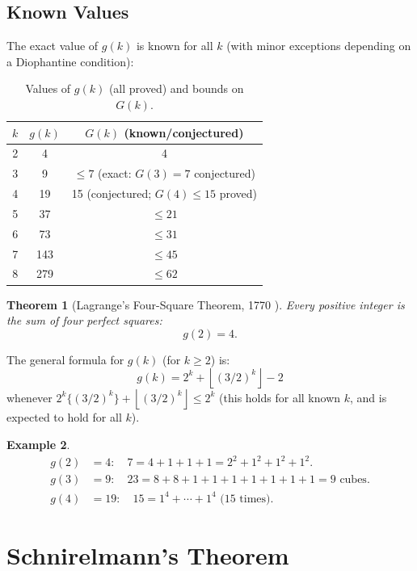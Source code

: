 \documentclass[12pt,a4paper]{amsart}
\newtheorem{theorem}{Theorem}[section]
\theoremstyle{definition}
\newtheorem{example}[theorem]{Example}
\newcommand{\floor}[1]{\left\lfloor #1 \right\rfloor}
\begin{document}
\subsection{Known Values}

The exact value of $g(k)$ is known for all $k$ (with minor exceptions
depending on a Diophantine condition):

\begin{table}[h]
\centering
\begin{tabular}{@{}ccc@{}}
\toprule
$k$ & $g(k)$ & $G(k)$ (known/conjectured) \\
\midrule
2 & 4  & 4 \\
3 & 9  & $\leq 7$ (exact: $G(3) = 7$ conjectured) \\
4 & 19 & 15 (conjectured; $G(4) \leq 15$ proved) \\
5 & 37 & $\leq 21$ \\
6 & 73 & $\leq 31$ \\
7 & 143 & $\leq 45$ \\
8 & 279 & $\leq 62$ \\
\bottomrule
\end{tabular}
\caption{Values of $g(k)$ (all proved) and bounds on $G(k)$.}
\label{tab:waring}
\end{table}

\begin{theorem}[Lagrange's Four-Square Theorem, 1770 \cite{Lagrange1770}]
Every positive integer is the sum of four perfect squares:
\[
  g(2) = 4.
\]
\end{theorem}

The general formula for $g(k)$ (for $k \geq 2$) is:
\[
  g(k) = 2^k + \floor{(3/2)^k} - 2
\]
whenever $2^k\{(3/2)^k\} + \floor{(3/2)^k} \leq 2^k$
(this holds for all known $k$, and is expected to hold for all $k$).

\begin{example}
\begin{align*}
  g(2) &= 4: \quad 7 = 4 + 1 + 1 + 1 = 2^2 + 1^2 + 1^2 + 1^2. \\
  g(3) &= 9: \quad 23 = 8 + 8 + 1 + 1 + 1 + 1 + 1 + 1 + 1 = 9 \text{ cubes}. \\
  g(4) &= 19: \quad 15 = 1^4 + \cdots + 1^4 \text{ (15 times)}.
\end{align*}
\end{example}

\section{Schnirelmann's Theorem}\label{sec:schnirelmann}
\end{document}
